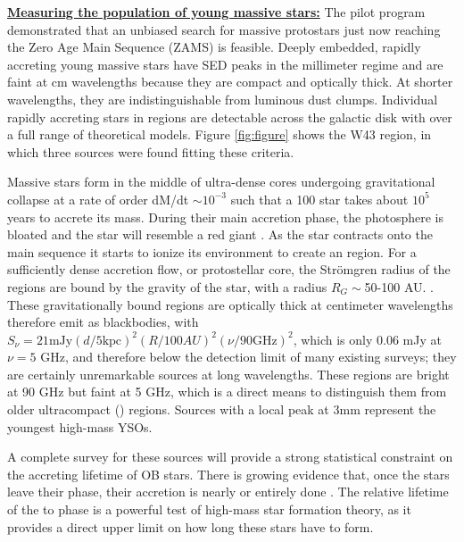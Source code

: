 \documentclass[11pt,preprint]{aastex_nofoot}
\begin{document}



\underline{\textbf{\helv Measuring the population of young massive stars:}}
The pilot program demonstrated that an unbiased search for massive protostars
just now reaching the Zero Age Main Sequence (ZAMS) is feasible.  Deeply
embedded, rapidly accreting young massive stars have
SED peaks in the millimeter regime and are faint at cm wavelengths because they
are compact and optically thick.  At shorter wavelengths, they are
indistinguishable from luminous dust clumps.  Individual rapidly accreting
stars in \hchii regions are  detectable across the galactic disk with
\MUSTANG over a full range of theoretical models.  Figure \ref{fig:figure}
shows the W43 region, in which three sources were found fitting these criteria.

Massive stars form in the middle of ultra-dense cores undergoing gravitational
collapse at a rate of order dM/dt $\sim 10^{-3}$ \msun \peryr such that a 100
\msun star takes about $10^5$ years to accrete its mass.  During their main
accretion phase, the photosphere is bloated and the star will resemble a
red giant \citep{Yorke2002a,Hosokawa2009a}.    As the star contracts onto the
main sequence it starts to ionize its environment to create an \hchii region.
For a sufficiently dense accretion flow, or protostellar core, the Strömgren
radius of the \hchii regions are bound by the gravity of the star, with a
radius $R_G \sim$50-100 AU. \citep{Keto2002a,Keto2003a,Keto2007a}.  These
gravitationally bound \hchii regions are optically thick at centimeter
wavelengths therefore emit as blackbodies, with $S_\nu=21 \textrm{mJy} (d/5
\textrm{kpc})^2 (R/100 AU)^2(\nu/90 \textrm{GHz})^2$, which is only 0.06 mJy at
$\nu=5$ GHz, and therefore below the detection limit of many existing surveys;
they are certainly unremarkable sources at long wavelengths.
These \hchii regions are bright at 90 GHz but faint at 5 GHz, which is a
direct means to distinguish them from older ultracompact (\uchii) regions.
Sources with a local peak at 3mm represent the youngest high-mass YSOs.

A complete survey for these sources will provide a strong statistical
constraint on the accreting lifetime of OB stars.  There is growing evidence
that, once the stars leave their \hchii phase, their accretion is nearly or
entirely done \citep[e.g.][]{Goddi2018a}.  The relative lifetime of the \hchii
to \uchii phase is a powerful test of high-mass star formation theory, as it
provides a direct upper limit on how long these stars have to form.
\end{document}
